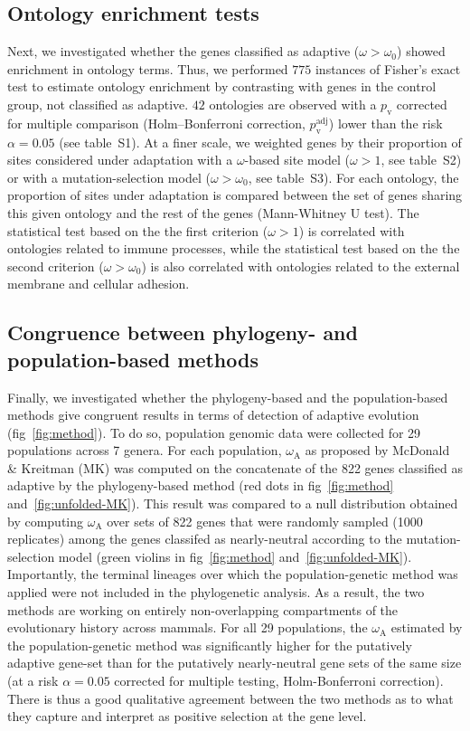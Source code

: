 \documentclass{article}
\newcommand{\rateApop}{\omega_{\mathrm{A}}}
\begin{document}
    \subsection*{Ontology enrichment tests}
    Next, we investigated whether the genes classified as adaptive ($\omega > \omega_{0}$) showed enrichment in ontology terms.
    Thus, we performed $775$ instances of Fisher's exact test to estimate ontology enrichment by contrasting with genes in the control group, not classified as adaptive.
    $42$ ontologies are observed with a $p_{\mathrm{v}}$ corrected for multiple comparison (Holm–Bonferroni correction, $p_{\mathrm{v}}^{\mathrm{adj}}$) lower than the risk $\alpha=0.05$ (see table~S1).
    At a finer scale, we weighted genes by their proportion of sites considered under adaptation with a $\omega$-based site model ($\omega > 1$, see table~S2) or with a mutation-selection model ($\omega > \omega_{0}$, see table~S3).
    For each ontology, the proportion of sites under adaptation is compared between the set of genes sharing this given ontology and the rest of the genes (Mann-Whitney U test).
    The statistical test based on the the first criterion ($\omega>1$) is correlated with ontologies related to immune processes, while the statistical test based on the the second criterion ($\omega > \omega_{0}$) is also correlated with ontologies related to the external membrane and cellular adhesion.

    \subsection*{Congruence between phylogeny- and population-based methods}
    Finally, we investigated whether the phylogeny-based and the population-based methods give congruent results in terms of detection of adaptive evolution (fig~\ref{fig:method}).
    To do so, population genomic data were collected for 29 populations across 7 genera.
    For each population, $\rateApop$ as proposed by McDonald \& Kreitman (MK)\cite{mcdonald_adaptative_1991} was computed on the concatenate of the 822 genes classified as adaptive by the phylogeny-based method (red dots in fig~\ref{fig:method} and~\ref{fig:unfolded-MK}).
    This result was compared to a null distribution obtained by computing $\rateApop$ over sets of 822 genes that were randomly sampled (1000 replicates) among the genes classifed as nearly-neutral according to the mutation-selection model (green violins in fig~\ref{fig:method} and~\ref{fig:unfolded-MK}).
    Importantly, the terminal lineages over which the population-genetic method was applied were not included in the phylogenetic analysis.
    As a result, the two methods are working on entirely non-overlapping compartments of the evolutionary history across mammals.
    For all 29 populations, the $\rateApop$ estimated by the population-genetic method was significantly higher for the putatively adaptive gene-set than for the putatively nearly-neutral gene sets of the same size (at a risk $\alpha=0.05$ corrected for multiple testing, Holm-Bonferroni correction).
    There is thus a good qualitative agreement between the two methods as to what they capture and interpret as positive selection at the gene level.
\end{document}
